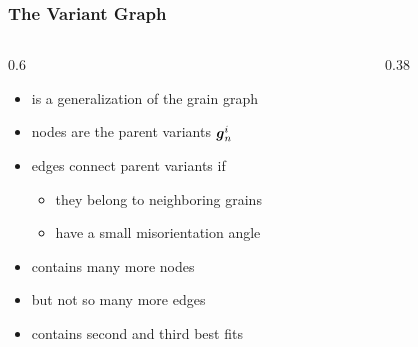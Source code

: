 \documentclass[compress,aspectratio=1610,fleqn,10pt]{beamer}
\renewcommand{\vec}[1]{\ensuremath \mathbf{\boldsymbol{#1}}}
\begin{document}
\begin{frame}
  \frametitle{The Variant Graph}

  \vspace{-0.3cm}
  \begin{columns}[T,onlytextwidth]
    \begin{column}{0.6\textwidth}
  
      
      \begin{overlayarea}{\textwidth}{\textheight}
        \begin{itemize}
        \item is a generalization of the grain graph
        \item nodes are the parent variants $\vec g_{n}^{i}$
        \item edges connect parent variants if
          \begin{itemize}
          \item they belong to neighboring grains
          \item have a small misorientation angle
          \end{itemize}
        \item contains many more nodes
        \item but not so many more edges
        \item contains second and third best fits
        \end{itemize}

      \begin{center}
      \end{center}
        
      \end{overlayarea}
      
    \end{column}
    \begin{column}{0.38\textwidth}

      \vspace{-0.8cm}
      
    \end{column}
  \end{columns}
  
\end{frame}





  
\end{document}
